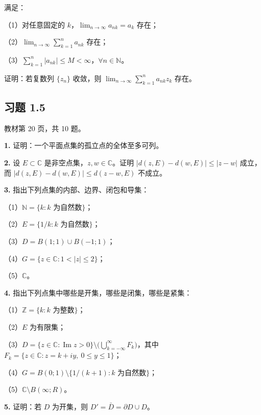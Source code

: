 \documentclass[11pt,a4paper]{article}
\begin{document}
满足：

（1）对任意固定的 \(k\)，\(\lim_{n\to\infty}a_{nk}=a_k\) 存在；

（2）\(\lim_{n\to\infty}\sum_{k=1}^na_{nk}\) 存在；

（3）\(\sum_{k=1}^n|a_{nk}|\le M<\infty\)，\(\forall n\in\mathbb N\)。

证明：若复数列 \(\{z_n\}\) 收敛，则
\(\lim_{n\to\infty}\sum_{k=1}^na_{nk}z_k\) 存在。

\subsection{习题 1.5}\label{ux4e60ux9898-1.5}

教材第 20 页，共 10 题。

\par{}
\noindent\textbf{1.} 证明：一个平面点集的孤立点的全体至多可列。

\par{}
\noindent\textbf{2.} 设 \(E\subset\mathbb C\)
是非空点集，\(z,w\in\mathbb C\)。证明 \(|d(z,E)-d(w,E)|\le|z-w|\)
成立，而 \(|d(z,E)-d(w,E)|\le d(z-w,E)\) 不成立。

\par{}
\noindent\textbf{3.} 指出下列点集的内部、边界、闭包和导集：

（1）\(\mathbb N=\{k:k\text{ 为自然数}\}\)；

（2）\(E=\{1/k:k\text{ 为自然数}\}\)；

（3）\(D=B(1;1)\cup B(-1;1)\)；

（4）\(G=\{z\in\mathbb C:1<|z|\le2\}\)；

（5）\(\mathbb C\)。

\par{}
\noindent\textbf{4.} 指出下列点集中哪些是开集，哪些是闭集，哪些是紧集：

（1）\(\mathbb Z=\{k:k\text{ 为整数}\}\)；

（2）\(E\) 为有限集；

（3）\(D=\{z\in\mathbb C:\operatorname{Im}z>0\}\setminus\bigl(\bigcup_{k=-\infty}^{\infty}F_k\bigr)\)，其中
\(F_k=\{z\in\mathbb C:z=k+iy,\ 0\le y\le1\}\)；

（4）\(G=B(0;1)\setminus\{1/(k+1):k\text{ 为自然数}\}\)；

（5）\(\mathbb C\setminus B(\infty;R)\)。

\par{}
\noindent\textbf{5.} 证明：若 \(D\) 为开集，则 \(D'=\bar D=\partial D\cup D\)。
\end{document}
